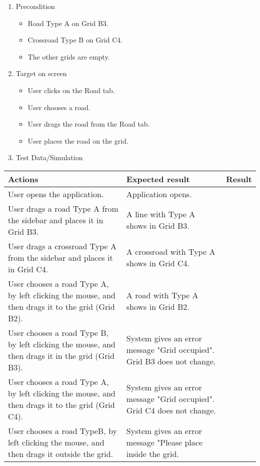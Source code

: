 \begin{enumerate}
		\item Precondition
		\begin{itemize}
			\item Road Type A on Grid B3.
			\item Crossroad Type B on Grid C4.
			\item The other grids are empty. 
		\end{itemize}
	
	\item Target on screen
	\begin{itemize}
		\item User clicks on the Road tab.
		\item User chooses a road.
		\item User drags the road from the Road tab.
		\item User places the road on the grid.
	\end{itemize}
	\item Test Data/Simulation
\end{enumerate}	
	\begin{tabularx}{\textwidth}{|X|X|p{2.5cm}|}\hline
		Actions & Expected result & Result \\\hline
		User opens the application.& Application opens. &  \pass \\\hline
		User drags a road Type A from the sidebar and places it in Grid B3. & A line with Type A shows in Grid B3. & \pass \\\hline
		User drags a crossroad Type A from the sidebar and places it in Grid C4. & A crossroad with Type A shows in Grid C4. & \pass \\\hline
		User chooses a road Type A, by left clicking the mouse, and then drags it to the grid (Grid B2). & A road with Type A shows in Grid B2. & \pass \\\hline
		User chooses a road Type B, by left clicking the mouse, and then drags it in the grid (Grid B3). & System gives an  error message "Grid occupied". Grid B3 does not change. & \pass\\\hline
		User chooses a road Type A, by left clicking the mouse, and then drags it to the grid (Grid C4). & System gives an  error message "Grid occupied". Grid C4 does not change. & \pass\\\hline
		User chooses a road TypeB, by left clicking the mouse, and then drags it outside the grid. & System gives an error message "Please place inside the grid. & \pass\\\hline
	\end{tabularx}


